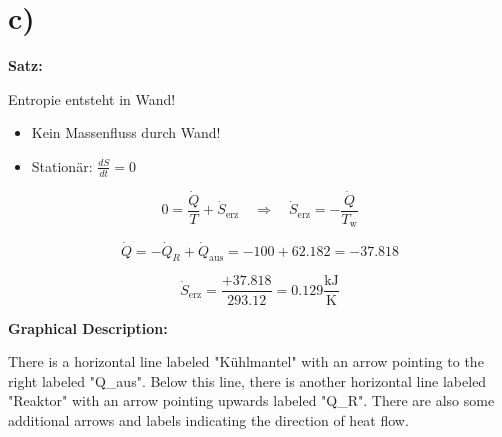 

\section*{c)}

\textbf{Satz:}

Entropie entsteht in Wand!

\begin{itemize}
    \item Kein Massenfluss durch Wand!
    \item Stationär: $\frac{dS}{dt} = 0$
\end{itemize}

\[
0 = \frac{\dot{Q}}{T} + \dot{S}_{\text{erz}} \quad \Rightarrow \quad \dot{S}_{\text{erz}} = -\frac{\dot{Q}}{T_{\text{w}}}
\]

\[
\dot{Q} = -\dot{Q}_{R} + \dot{Q}_{\text{aus}} = -100 + 62.182 = -37.818
\]

\[
\dot{S}_{\text{erz}} = \frac{+37.818}{293.12} = 0.129 \frac{\text{kJ}}{\text{K}}
\]

\textbf{Graphical Description:}

There is a horizontal line labeled "Kühlmantel" with an arrow pointing to the right labeled "Q_{aus}". Below this line, there is another horizontal line labeled "Reaktor" with an arrow pointing upwards labeled "Q_{R}". There are also some additional arrows and labels indicating the direction of heat flow.